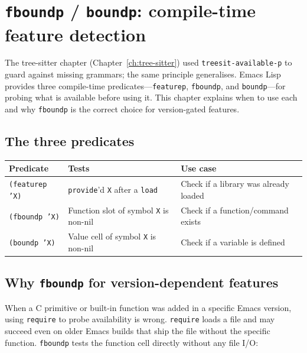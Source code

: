 \chapter{\texttt{fboundp} / \texttt{boundp}: compile-time feature detection}
\label{ch:fboundp}
\minitoc\label{fboundp-boundp-compile-time-feature-detection}

The tree-sitter chapter (Chapter~\ref{ch:tree-sitter}) used
\texttt{treesit-available-p} to guard against missing grammars; the
same principle generalises.  Emacs Lisp provides three compile-time
predicates---\texttt{featurep},
\texttt{fboundp}, and \texttt{boundp}---for probing what is available
before using it.  This chapter explains when to use each and why
\texttt{fboundp} is the correct choice for version-gated features.

\section{The three predicates}\label{the-three-predicates}

\begin{longtable}[]{@{}lll@{}}
\toprule
Predicate & Tests & Use case \\
\midrule
\texttt{(featurep 'X)} & \texttt{provide}'d \texttt{X} after a \texttt{load} & Check if a library was already loaded \\
\texttt{(fboundp 'X)} & Function slot of symbol \texttt{X} is non-nil & Check if a function/command exists \\
\texttt{(boundp 'X)} & Value cell of symbol \texttt{X} is non-nil & Check if a variable is defined \\
\bottomrule
\end{longtable}

\section{Why \texttt{fboundp} for version-dependent features}\label{why-fboundp-for-version-dependent-features}

When a C primitive or built-in function was added in a specific Emacs version, using \texttt{require} to probe availability is wrong. \texttt{require} loads a file and may succeed even on older Emacs builds that ship the file without the specific function. \texttt{fboundp} tests the function cell directly without any file I/O:

